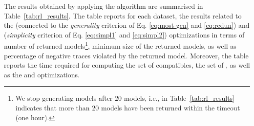 %
The results obtained by applying the \nd algorithm are summarised in Table~\ref{tab:rl_results}. The table reports for each dataset, the results related to the \subsetclos (connected to the \emph{generality} criterion of Eq. \ref{eq:most-gen} and \ref{eq:redun}) and \minclos (\emph{simplicity} criterion of Eq. \ref{eq:simpl1} and \ref{eq:simpl2}) optimizations in terms of number of returned models\footnote{We stop generating models after $20$ models, i.e.,  in Table~\ref{tab:rl_results} indicates that more than $20$ models have been returned within the timeout (one hour).}, minimum size of the returned models, as well as percentage of negative traces violated by the returned model. Moreover, the table reports the time required for computing the set of compatibles, the set of \sheriff, as well as the \subsetclos and \minclos optimizations.

